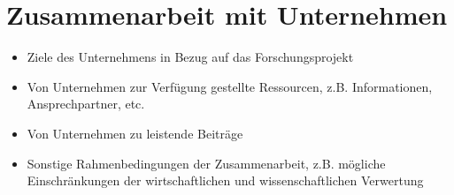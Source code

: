 \section{Zusammenarbeit mit Unternehmen}
\label{sec:Zusammenarbeit}
\begin{itemize}
  \item Ziele des Unternehmens in Bezug auf das Forschungsprojekt
  \item Von Unternehmen zur Verfügung gestellte Ressourcen, z.B. Informationen, Ansprechpartner, etc.
  \item Von Unternehmen zu leistende Beiträge 
  \item Sonstige Rahmenbedingungen der Zusammenarbeit, z.B. mögliche Einschränkungen der wirtschaftlichen und wissenschaftlichen Verwertung
\end{itemize}